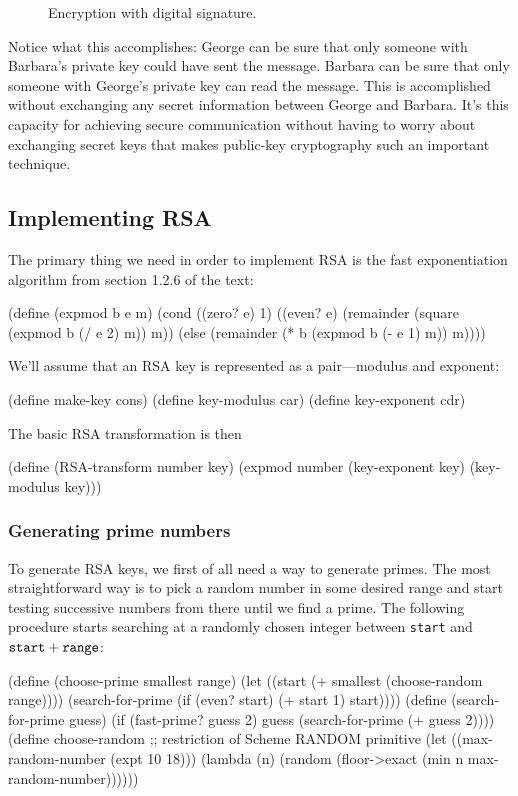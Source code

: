 \begin{figure}
\caption {Encryption with digital signature.}
\label{digital-signature}
\end{figure}

Notice what this accomplishes: George can be sure that only someone
with Barbara's private key could have sent the message.  Barbara can
be sure that only someone with George's private key can read the
message.  This is accomplished without exchanging any secret
information between George and Barbara.  It's this capacity for
achieving secure communication without having to worry about
exchanging secret keys that makes public-key cryptography such an
important technique.


\subsection{Implementing RSA}

The primary thing we need in order to implement RSA is the fast
exponentiation algorithm from section 1.2.6 of the text:

\beginlisp
(define (expmod b e m)
  (cond ((zero? e) 1)
        ((even? e)
         (remainder (square (expmod b (/ e 2) m)) m))
        (else (remainder (* b (expmod b (- e 1) m)) m))))
\endlisp

\noindent
We'll assume that an RSA key is represented as a pair---modulus and exponent:

\beginlisp
(define make-key cons)
(define key-modulus car)
(define key-exponent cdr)
\endlisp

\noindent
The basic RSA transformation is then

\beginlisp
(define (RSA-transform number key)
  (expmod number (key-exponent key) (key-modulus key)))
\endlisp

\subsubsection{Generating prime numbers}

To generate RSA keys, we first of all need a way to generate primes.
The most straightforward way is to pick a random number in some
desired range and start testing successive numbers from there until we
find a prime.  The following procedure starts searching at a randomly
chosen integer between {\tt start} and ${\tt start}+{\tt range}$:

\beginlisp
(define (choose-prime smallest range)
  (let ((start (+ smallest (choose-random range))))
    (search-for-prime (if (even? start) (+ start 1) start))))
\null
(define (search-for-prime guess)
  (if (fast-prime? guess 2)
      guess
      (search-for-prime (+ guess 2))))
\null
(define choose-random
  ;; restriction of Scheme RANDOM primitive
  (let ((max-random-number (expt 10 18)))
    (lambda (n)
      (random (floor->exact (min n max-random-number))))))
\endlisp

